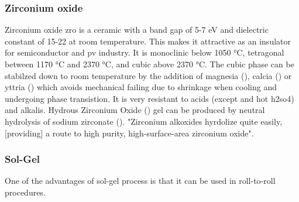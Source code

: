 \subsubsection{Zirconium oxide}
Zirconium oxide \gls{zro} is a ceramic with a band gap of 5-7 eV and dielectric constant of 15-22 at room temperature\cite{Anwar2017}. 
This makes it attractive as an insulator for semiconductor and \gls{pv} industry. 
It is monoclinic below 1050 °C, tetragonal between 1170 °C and 2370 °C, and cubic above 2370 °C\cite{Nielsen2005}.
The cubic phase can be stabilzed down to room temperature by the addition of magnesia (), calcia () or yttria () which avoids mechanical failing due to shrinkage 
when cooling and undergoing phase transistion\cite{Nielsen2005}.
It is very resistant to acids (except  and hot \gls{h2so4}) and alkalis\cite{Nielsen2005}.
Hydrous Zirconium Oxide () gel can be produced by neutral hydrolysis of sodium zirconate (). 
"Zirconium alkoxides hyrdolize quite easily, [providing] a route to high purity, high-surface-area zirconium oxide"\cite{Nielsen2005}.


\subsubsection{Sol-Gel}
One of the advantages of sol-gel process is that it can be used in roll-to-roll procedures.

